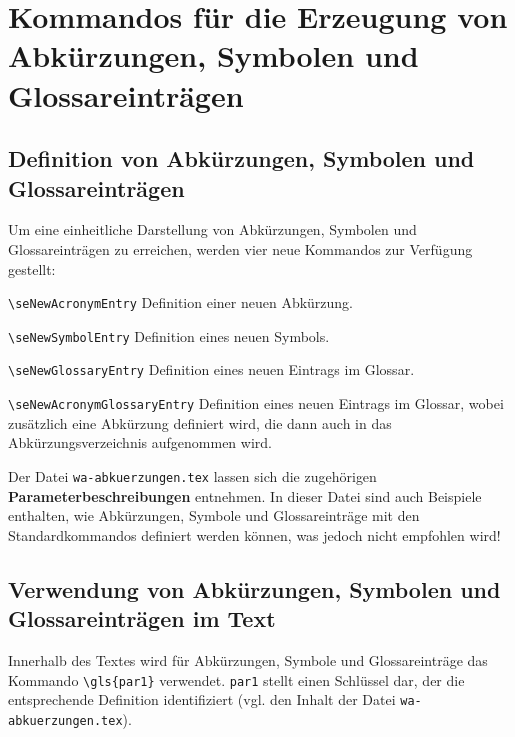\newcommand{\dateiAbk}{\texttt{wa-abkuerzungen.tex}}
%
%
%
\section{Kommandos f\"ur die Erzeugung von Abk\"urzungen, Symbolen und Glos\-sar\-eint\-r\"a\-gen}

\subsection{Definition von Abk\"urzungen, Symbolen und Glossareintr\"agen}

Um eine einheitliche Darstellung von Abk\"urzungen, Symbolen und Glossareintr\"agen zu erreichen, 
werden vier neue Kommandos zur Verf\"ugung gestellt:

\begin{seList}
\item 
\verb+\seNewAcronymEntry+\newline
Definition einer neuen Abk\"urzung.
\item 
\verb+\seNewSymbolEntry+\newline
Definition eines neuen Symbols.
\item
\verb+\seNewGlossaryEntry+\newline
Definition eines neuen Eintrags im Glossar.
\item
\verb+\seNewAcronymGlossaryEntry+\newline
Definition eines neuen Eintrags im Glossar, wobei zus\"atzlich eine 
Abk\"urzung definiert wird, die dann auch in das Abk\"urzungsverzeichnis aufgenommen wird.
\end{seList}

Der Datei \dateiAbk{} lassen sich die zugeh\"origen \textbf{Pa\-ra\-me\-ter\-be\-schrei\-bun\-gen}  
entnehmen.
In dieser Datei sind auch Beispiele enthalten, wie Abk\"urzungen, Symbole und Glossareintr\"age mit den 
Standardkommandos definiert werden k\"onnen, was jedoch nicht empfohlen wird!

\subsection{Verwendung von Abk\"urzungen, Symbolen und Glossareintr\"agen im Text}

Innerhalb des Textes wird f\"ur Abk\"urzungen, Symbole und Glossareintr\"age das Kommando \verb+\gls{par1}+ 
verwendet.
\texttt{par1} stellt einen Schl\"ussel dar, der die entsprechende Definition identifiziert (vgl. den Inhalt der Datei
\dateiAbk{}). 

